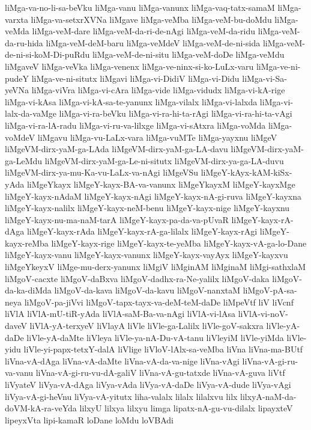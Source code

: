 {liMga-va-no-li-sa-beVku
liMga-vanu
liMga-vanunx
liMga-vaq-tatx-samaM
liMga-varxta
liMga-va-setxrXVNa
liMgave
liMga-veMba
liMga-veM-bu-doMdu
liMga-veMda
liMga-veM-dare
liMga-veM-da-ri-de-nAgi
liMga-veM-da-ridu
liMga-veM-da-ru-hida
liMga-veM-deM-baru
liMga-veMdeV
liMga-veM-de-ni-sida
liMga-veM-de-ni-si-koM-Di-puRdu
liMga-veM-de-ni-situ
liMga-veM-doDe
liMga-veMdu
liMgaveV
liMga-veVka
liMga-venenx
liMga-ve-ninx-si-ko-LuLx-varu
liMga-ve-ni-pudeY
liMga-ve-ni-situtx
liMgavi
liMga-vi-DidiV
liMga-vi-Didu
liMga-vi-Sa-yeVNa
liMga-viVra
liMga-vi-cAra
liMga-vide
liMga-vidudx
liMga-vi-kA-rige
liMga-vi-kAsa
liMga-vi-kA-sa-te-yanunx
liMga-vilalx
liMga-vi-lalxda
liMga-vi-lalx-da-vaMge
liMga-vi-ra-beVku
liMga-vi-ra-hi-ta-rAgi
liMga-vi-ra-hi-ta-vAgi
liMga-vi-ra-lA-radu
liMga-vi-ru-va-lilxge
liMga-vi-sAtxra
liMga-voMda
liMga-voMdeV
liMgavu
liMga-vu-LaLx-vara
liMga-vuMTe
liMga-yayxnu
liMgeV
liMgeVM-dirx-yaM-ga-LAda
liMgeVM-dirx-yaM-ga-LA-davu
liMgeVM-dirx-yaM-ga-LeMdu
liMgeVM-dirx-yaM-ga-Le-ni-situtx
liMgeVM-dirx-ya-ga-LA-duvu
liMgeVM-dirx-ya-mu-Ka-vu-LaLx-va-nAgi
liMgeVSu
liMgeY-kAyx-kAM-kiSx-yAda
liMgeYkayx
liMgeY-kayx-BA-va-vanunx
liMgeYkayxM
liMgeY-kayxMge
liMgeY-kayx-nAdaM
liMgeY-kayx-nAgi
liMgeY-kayx-nA-gi-ruva
liMgeY-kayxna
liMgeY-kayx-nalilx
liMgeY-kayx-neM-benu
liMgeY-kayx-nige
liMgeY-kayxnu
liMgeY-kayx-nu-ma-naM-tarA
liMgeY-kayx-pa-da-va-pUvaR
liMgeY-kayx-rA-dAga
liMgeY-kayx-rAda
liMgeY-kayx-rA-ga-lilalx
liMgeY-kayx-rAgi
liMgeY-kayx-reMba
liMgeY-kayx-rige
liMgeY-kayx-te-yeMba
liMgeY-kayx-vA-ga-lo-Dane
liMgeY-kayx-vanu
liMgeY-kayx-vanunx
liMgeY-kayx-vayAyx
liMgeY-kayxvu
liMgeYkeyxV
liMge-mu-derx-yanunx
liMgiV
liMginAM
liMginaM
liMgi-sathxlaM
liMgoV-cacxte
liMgoV-daBxva
liMgoV-dadhx-ra-Ne-yalilx
liMgoV-daka
liMgoV-da-ka-diMda
liMgoV-da-kava
liMgoV-da-kavu
liMgoV-nanxtaM
liMgoV-pA-sa-neya
liMgoV-pa-jiVvi
liMgoV-tapx-tayx-va-deM-teM-daDe
liMpeVtf
liV
liVcnf
liVlA
liVlA-mU-tiR-yAda
liVlA-saM-Ba-va-nAgi
liVlA-vi-lAsa
liVlA-vi-noV-daveV
liVlA-yA-terxyeV
liVlayA
liVle
liVle-ga-Lalilx
liVle-goV-sakxra
liVle-yA-daDe
liVle-yA-daMte
liVleya
liVle-ya-nA-Du-vA-tanu
liVleyiM
liVle-yiMda
liVle-yidu
liVle-yi-papx-tetxY-dalA
liVlige
liVloV-lAlx-sa-veMba
liVna
liVna-ma-BUtf
liVna-vA-dAga
liVna-vA-daMte
liVna-vA-da-va-nige
liVna-vAgi
liVna-vA-gi-ru-va-vanu
liVna-vA-gi-ru-vu-dA-galiV
liVna-vA-gu-tatxde
liVna-vA-guva
liVtf
liVyateV
liVya-vA-dAga
liVya-vAda
liVya-vA-daDe
liVya-vA-dude
liVya-vAgi
liVya-vA-gi-heVnu
liVya-vA-yitutx
liha-valalx
lilalx
lilalxvu
lilx
lilxyA-naM-da-doVM-kA-ra-veYda
lilxyU
lilxya
lilxyu
limga
lipatx-nA-gu-vu-dilalx
lipayxteV
lipeyxVta
lipi-kamaR
loDane
loMdu
loVBAdi
}
